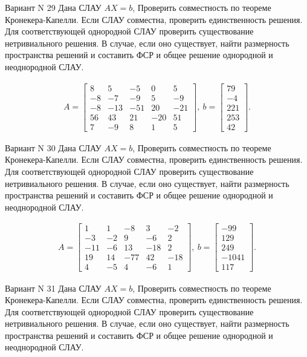 \documentclass[11pt]{report}
\begin{document}
Вариант N 29
Дана СЛАУ $AX = b$,
Проверить совместность по теореме Кронекера-Капелли. Если СЛАУ совместна, проверить единственность решения.
Для соответствующей однородной СЛАУ проверить существование нетривиального решения. В случае, если оно существует,
найти размерность пространства решений и составить ФСР и общее решение однородной  и неоднородной СЛАУ.


\begin{align*}
 A = \left[\begin{matrix}8 & 5 & -5 & 0 & 5\\-8 & -7 & -9 & 5 & -9\\-8 & -13 & -51 & 20 & -21\\56 & 43 & 21 & -20 & 51\\7 & -9 & 8 & 1 & 5\end{matrix}\right],
\ b = \left[\begin{matrix}79\\-4\\221\\253\\42\end{matrix}\right]. 
 \end{align*}

Вариант N 30
Дана СЛАУ $AX = b$,
Проверить совместность по теореме Кронекера-Капелли. Если СЛАУ совместна, проверить единственность решения.
Для соответствующей однородной СЛАУ проверить существование нетривиального решения. В случае, если оно существует,
найти размерность пространства решений и составить ФСР и общее решение однородной  и неоднородной СЛАУ.


\begin{align*}
 A = \left[\begin{matrix}1 & 1 & -8 & 3 & -2\\-3 & -2 & 9 & -6 & 2\\-11 & -6 & 13 & -18 & 2\\19 & 14 & -77 & 42 & -18\\4 & -5 & 4 & -6 & 1\end{matrix}\right],
\ b = \left[\begin{matrix}-99\\129\\249\\-1041\\117\end{matrix}\right]. 
 \end{align*}

Вариант N 31
Дана СЛАУ $AX = b$,
Проверить совместность по теореме Кронекера-Капелли. Если СЛАУ совместна, проверить единственность решения.
Для соответствующей однородной СЛАУ проверить существование нетривиального решения. В случае, если оно существует,
найти размерность пространства решений и составить ФСР и общее решение однородной  и неоднородной СЛАУ.
\end{document}
